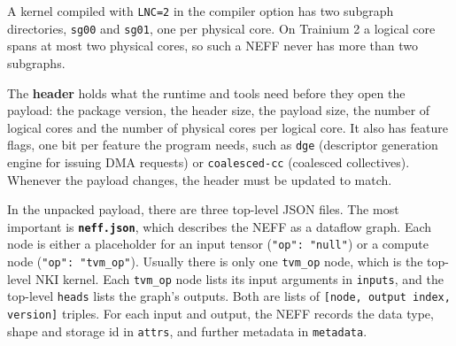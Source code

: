 \documentclass{article}
\newcommand{\code}[1]{\texttt{#1}}
\begin{document}
A kernel compiled with \code{LNC=2} in the compiler option has two subgraph directories, \code{sg00} and \code{sg01}, one per physical core. On Trainium 2 a logical core spans at most two physical cores, so such a NEFF never has more than two subgraphs.

The \textbf{header} holds what the runtime and tools need before they open the payload: the package version, the header size, the payload size, the number of logical cores and the number of physical cores per logical core. It also has feature flags, one bit per feature the program needs, such as \code{dge} (descriptor generation engine for issuing DMA requests) or \code{coalesced-cc} (coalesced collectives). Whenever the payload changes, the header must be updated to match.

In the unpacked payload, there are three top-level JSON files. The most important is \textbf{\code{neff.json}}, which describes the NEFF as a dataflow graph. Each node is either a placeholder for an input tensor (\code{"op": "null"}) or a compute node (\code{"op": "tvm\_op"}). Usually there is only one \code{tvm\_op} node, which is the top-level NKI kernel. Each \code{tvm\_op} node lists its input arguments in \code{inputs}, and the top-level \code{heads} lists the graph's outputs. Both are lists of \code{[node, output index, version]} triples. For each input and output, the NEFF records the data type, shape and storage id in \code{attrs}, and further metadata in \code{metadata}.
\end{document}
